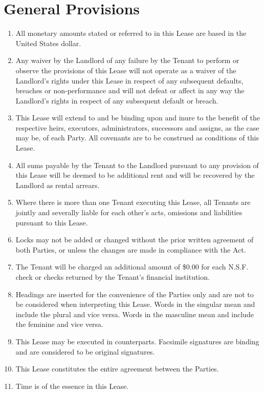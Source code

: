\documentclass[12pt]{article}
\begin{document}
\section*{General Provisions}
\begin{enumerate}[resume]
    \item All monetary amounts stated or referred to in this Lease are based in
	    the United States dollar.
    \item Any waiver by the Landlord of any failure by the Tenant to perform or
	    observe the provisions of this Lease will not operate as a waiver
		of the Landlord's rights under this Lease in respect of any
		subsequent defaults, breaches or non-performance and will not
		defeat or affect in any way the Landlord's rights in respect of
		any subsequent default or breach.
    \item This Lease will extend to and be binding upon and inure to the
	    benefit of the respective heirs, executors, administrators,
		successors and assigns, as the case may be, of each Party. All
		covenants are to be construed as conditions of this Lease.
    \item All sums payable by the Tenant to the Landlord pursuant to any
	    provision of this Lease will be deemed to be additional rent and
		will be recovered by the Landlord as rental arrears.
    \item Where there is more than one Tenant executing this Lease, all Tenants
	    are jointly and severally liable for each other's acts, omissions
		and liabilities pursuant to this Lease.
    \item Locks may not be added or changed without the prior written agreement
	    of both Parties, or unless the changes are made in compliance with
		the Act.
    \item The Tenant will be charged an additional amount of \$0.00 for each
	    N.S.F. check or checks returned by the Tenant's financial
		institution.
    \item Headings are inserted for the convenience of the Parties only and are
	    not to be considered when interpreting this Lease. Words in the
		singular mean and include the plural and vice versa. Words in
		the masculine mean and include the feminine and vice versa.
    \item This Lease may be executed in counterparts. Facsimile signatures are
	    binding and are considered to be original signatures.
    \item This Lease constitutes the entire agreement between the Parties.
    \item Time is of the essence in this Lease.
\end{enumerate}
\end{document}

